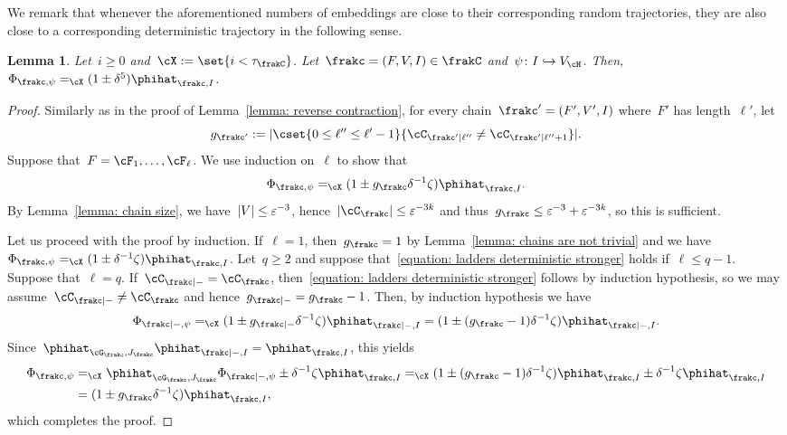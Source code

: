 \documentclass[11pt]{amsart}
\newcommand{\eps}{\varepsilon}
\DeclarePairedDelimiter{\abs}{\lvert}{\rvert}
\newcommand{\Xeq}{=_{\cX}}
\newcommand{\injection}{\hookrightarrow}
\newcommand{\om}{\mathord{-}}
\newtheorem{lemma}[algocf]{Lemma}
\theoremstyle{definition}
\numberwithin{equation}{section}
\begin{document}
	We remark that whenever the aforementioned numbers of embeddings are close to their corresponding random trajectories, they are also close to a corresponding deterministic trajectory in the following sense.
	\begin{lemma}\label{lemma: ladders deterministic trajectory}
		Let~$i\geq 0$ and~$\cX:=\set{i<\tau_{\frakC}}$.
		Let~$\frakc=(F,V,I)\in\frakC$ and~$\psi\colon I\injection V_\cH$.
		Then,~$\Phi_{\frakc,\psi}\Xeq (1\pm \delta^5)\phihat_{\frakc,I}$.
	\end{lemma}
	\begin{proof}
		Similarly as in the proof of Lemma~\ref{lemma: reverse contraction}, for every chain~$\frakc'=(F',V',I)$ where~$F'$ has length~$\ell'$, let
		\begin{equation*}
			g_{\frakc'}:=\abs{ \cset{ 0\leq\ell''\leq\ell'-1 }{ \cC_{\frakc'|\ell''}\neq\cC_{\frakc'|\ell''+1} } }.
		\end{equation*}
		Suppose that~$F=\cF_1,\ldots,\cF_\ell$.
		We use induction on~$\ell$ to show that
		\begin{equation}\label{equation: ladders deterministic stronger}
			\Phi_{\frakc,\psi}\Xeq (1\pm g_\frakc\delta^{-1}\zeta)\phihat_{\frakc,I}.
		\end{equation}
		By Lemma~\ref{lemma: chain size}, we have~$\abs{V}\leq \eps^{-3}$, hence~$\abs{\cC_\frakc}\leq \eps^{-3k}$ and thus~$g_\frakc\leq\eps^{-3}+\eps^{-3k}$, so this is sufficient.
		
		Let us proceed with the proof by induction.
		If~$\ell=1$, then~$g_\frakc=1$ by Lemma~\ref{lemma: chains are not trivial} and we have~$\Phi_{\frakc,\psi}\Xeq (1\pm\delta^{-1}\zeta)\phihat_{\frakc,I}$.
		Let~$q\geq 2$ and suppose that~\eqref{equation: ladders deterministic stronger} holds if~$\ell\leq q-1$.
		Suppose that~$\ell=q$.
		If~$\cC_{\frakc|\om}=\cC_\frakc$, then~\eqref{equation: ladders deterministic stronger} follows by induction hypothesis, so we may assume~$\cC_{\frakc|\om}\neq\cC_\frakc$ and hence~$g_{\frakc|\om}=g_{\frakc}-1$.
		Then, by induction hypothesis we have
		\begin{equation*}
			\Phi_{\frakc|\om,\psi}
			\Xeq (1\pm g_{\frakc|\om}\delta^{-1}\zeta)\phihat_{\frakc|\om,I}
			=(1\pm (g_{\frakc}-1)\delta^{-1}\zeta)\phihat_{\frakc|\om,I}.
		\end{equation*}
		Since~$\phihat_{\cG_\frakc,J_\frakc}\phihat_{\frakc|\om,I}=\phihat_{\frakc,I}$, this yields
		\begin{equation*}
			\begin{aligned}
				\Phi_{\frakc,\psi}
				&\Xeq \phihat_{\cG_\frakc,J_\frakc}\Phi_{\frakc|\om,\psi}\pm \delta^{-1}\zeta\phihat_{\frakc,I}
				\Xeq (1\pm (g_\frakc-1)\delta^{-1}\zeta)\phihat_{\frakc,I}\pm \delta^{-1}\zeta\phihat_{\frakc,I}\\
				&=(1\pm g_\frakc\delta^{-1}\zeta)\phihat_{\frakc,I},
			\end{aligned}
		\end{equation*}
		which completes the proof.
	\end{proof}
	
\end{document}
